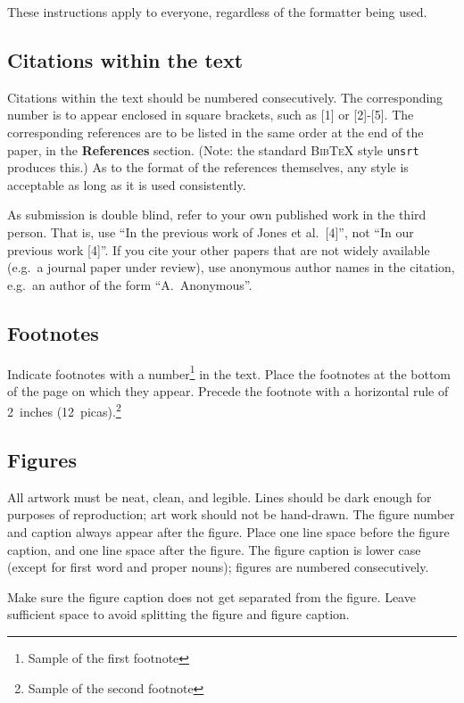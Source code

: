 \documentclass{article} %
\begin{document}
These instructions apply to everyone, regardless of the formatter being used.

\subsection{Citations within the text}

Citations within the text should be numbered consecutively. The corresponding
number is to appear enclosed in square brackets, such as [1] or [2]-[5]. The
corresponding references are to be listed in the same order at the end of the
paper, in the \textbf{References} section. (Note: the standard
\textsc{Bib\TeX} style \texttt{unsrt} produces this.) As to the format of the
references themselves, any style is acceptable as long as it is used
consistently.

As submission is double blind, refer to your own published work in the 
third person. That is, use ``In the previous work of Jones et al.\ [4]'',
not ``In our previous work [4]''. If you cite your other papers that
are not widely available (e.g.\ a journal paper under review), use
anonymous author names in the citation, e.g.\ an author of the
form ``A.\ Anonymous''. 


\subsection{Footnotes}

Indicate footnotes with a number\footnote{Sample of the first footnote} in the
text. Place the footnotes at the bottom of the page on which they appear.
Precede the footnote with a horizontal rule of 2~inches
(12~picas).\footnote{Sample of the second footnote}

\subsection{Figures}

All artwork must be neat, clean, and legible. Lines should be dark
enough for purposes of reproduction; art work should not be
hand-drawn. The figure number and caption always appear after the
figure. Place one line space before the figure caption, and one line
space after the figure. The figure caption is lower case (except for
first word and proper nouns); figures are numbered consecutively.

Make sure the figure caption does not get separated from the figure.
Leave sufficient space to avoid splitting the figure and figure caption.
\end{document}
